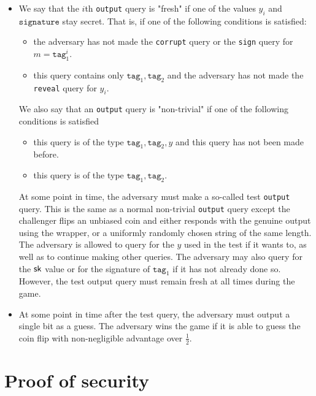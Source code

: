 \documentclass[12pt]{article}
\begin{document}
\begin{itemize}
	\item We say that the $i$th \texttt{output} query is "fresh" if one of the values $y_i$ and $\mathrm{\texttt{signature}}$ stay secret. That is, if one of the following conditions is satisfied:
	\begin{itemize}
		\item the adversary has not made the \texttt{corrupt} query or the \texttt{sign} query for $m = \texttt{tag}_1^i$. 
		\item this query contains only $\texttt{tag}_1, \texttt{tag}_2$ and the adversary has not made the \texttt{reveal} query for  $y_i$.
	\end{itemize}
	
We also say that an \texttt{output} query is "non-trivial" if one of the following conditions is satisfied
	
	\begin{itemize}
		\item this query is of the type $\texttt{tag}_1, \texttt{tag}_2, y$ and this query has not been made before. 
		
		\item this query is of the type $\texttt{tag}_1, \texttt{tag}_2$.  
	\end{itemize}
	
	
	At some point in time, the adversary must make a so-called test \texttt{output} query. This is the same as a normal non-trivial \texttt{output} query except the challenger flips an unbiased coin and either responds with the genuine output using the wrapper, or a uniformly randomly chosen string of the same length. The adversary is allowed to query for the $y$ used in the test if it wants to, as well as to continue making other queries. The adversary may also query for the $\mathsf{sk}$ value or for the signature of $\texttt{tag}_1$ if it has not already done so. However, the test output query must remain fresh at all times during the game.
	
\item At some point in time after the test query, the adversary must output a single bit as a guess. The adversary wins the game if it is able to guess the coin flip with non-negligible advantage over $\frac{1}{2}$.
\end{itemize}

\section{Proof of security} \label{proof}
\end{document}
